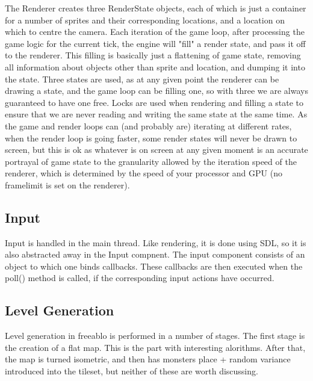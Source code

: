     The Renderer creates three RenderState objects, each of which is just a container for a number of sprites and their corresponding locations, and a location on which to centre the camera.
    Each iteration of the game loop, after processing the game logic for the current tick, the engine will "fill" a render state, and pass it off to the renderer. This filling is basically just a flattening of game state, removing all information about objects other than sprite and location, and dumping it into the state.
    Three states are used, as at any given point the renderer can be drawing a state, and the game loop can be filling one, so with three we are always guaranteed to have one free.
    Locks are used when rendering and filling a state to ensure that we are never reading and writing the same state at the same time.
    As the game and render loops can (and probably are) iterating at different rates, when the render loop is going faster, some render states will never be drawn to screen, but this is ok as whatever is on screen at any given moment is an accurate portrayal of game state to the granularity allowed by the iteration speed of the renderer, which is determined by the speed of your processor and GPU (no framelimit is set on the renderer).
        
    \subsection{Input}
    Input is handled in the main thread. Like rendering, it is done using SDL, so it is also abstracted away in the Input compnent.
    The input component consists of an object to which one binds callbacks. These callbacks are then executed when the poll() method is called, if the corresponding input actions have occurred.


\subsection{Level Generation}
    Level generation in freeablo is performed in a number of stages. The first stage is the creation of a flat map. This is the part with interesting alorithms.
    After that, the map is turned isometric, and then has monsters place + random variance introduced into the tileset, but neither of these are worth discussing.

    \mbox{}

